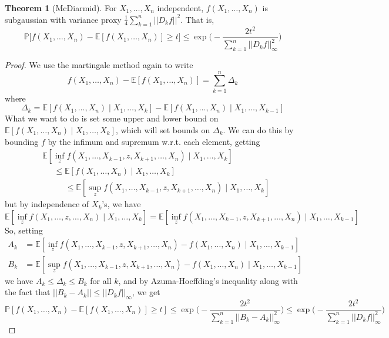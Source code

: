\documentclass{article}
\theoremstyle{definition}
\newtheorem{theorem}{Theorem}[section]
\theoremstyle{remark}
\theoremstyle{definition}
\begin{document}
\begin{theorem}[McDiarmid]
For $X_1, \ldots, X_n$ independent, $f(X_1, \ldots, X_n)$ is subgaussian with variance proxy $\frac{1}{4} \sum_{k=1}^n ||D_k f||^2$. That is, 
\[\mathbb{P}\big[ f(X_1, \ldots, X_n) - \mathbb{E}[f(X_1, \ldots, X_n)] \geq t \big] \leq \exp \bigg( -\frac{2 t^2}{\sum_{k=1}^n ||D_k f||^2_\infty} \bigg)\]
\end{theorem}
\begin{proof}
We use the martingale method again to write 
\[f(X_1, \ldots, X_n) - \mathbb{E}[f(X_1, \ldots, X_n)] = \sum_{k=1}^n \Delta_k\]
where 
\[\Delta_k = \mathbb{E}[f(X_1, \ldots, X_n) \mid X_1, \ldots, X_k] - \mathbb{E}[f(X_1, \ldots, X_n) \mid X_1, \ldots, X_{k-1}]\]
What we want to do is set some upper and lower bound on $\mathbb{E}[f(X_1, \ldots, X_n) \mid X_1, \ldots, X_k]$, which will set bounds on $\Delta_k$. We can do this by bounding $f$ by the infimum and supremum w.r.t. each element, getting 
\begin{align*}
    &\mathbb{E}[ \inf_z f(X_1, \ldots, X_{k-1}, z, X_{k+1}, \ldots, X_n) \mid X_1, \ldots, X_k] \\
    &\;\;\;\;\;\leq \mathbb{E}[f (X_1, \ldots, X_n) \mid X_1, \ldots, X_k] \\
    &\;\;\;\;\;\;\;\;\;\; \leq \mathbb{E}[ \sup_z f(X_1, \ldots, X_{k-1}, z, X_{k+1}, \ldots, X_n) \mid X_1, \ldots, X_k]
\end{align*}
but by independence of $X_k$'s, we have 
\[\mathbb{E}[ \inf_z f(X_1, \ldots, z, \ldots, X_n) \mid X_1, \ldots, X_k] = \mathbb{E}[ \inf_z f(X_1, \ldots, X_{k-1}, z, X_{k+1}, \ldots, X_n) \mid X_1, \ldots, X_{k-1}]\]
So, setting 
\begin{align*}
    A_k & = \mathbb{E}[ \inf_z f(X_1, \ldots, X_{k-1}, z, X_{k+1}, \ldots, X_n) - f(X_1, \ldots, X_n) \mid X_1, \ldots, X_{k-1}] \\
    B_k & = \mathbb{E}[ \sup_z f(X_1, \ldots, X_{k-1}, z, X_{k+1}, \ldots, X_n) - f(X_1, \ldots, X_n) \mid X_1, \ldots, X_{k-1}]
\end{align*}
we have $A_k \leq \Delta_k \leq B_k$ for all $k$, and by Azuma-Hoeffding's inequality along with the fact that $||B_k - A_k|| \leq ||D_k f||_\infty$, we get 
\[\mathbb{P}[ f(X_1, \ldots, X_n) - \mathbb{E}[ f(X_1, \ldots, X_n)] \geq t] \leq \exp \bigg(- \frac{2t^2}{\sum_{k=1}^n ||B_k - A_k||^2_\infty} \bigg) \leq \exp \bigg(- \frac{2t^2}{\sum_{k=1}^n ||D_k f||^2_\infty} \bigg)\]
\end{proof}
\end{document}
